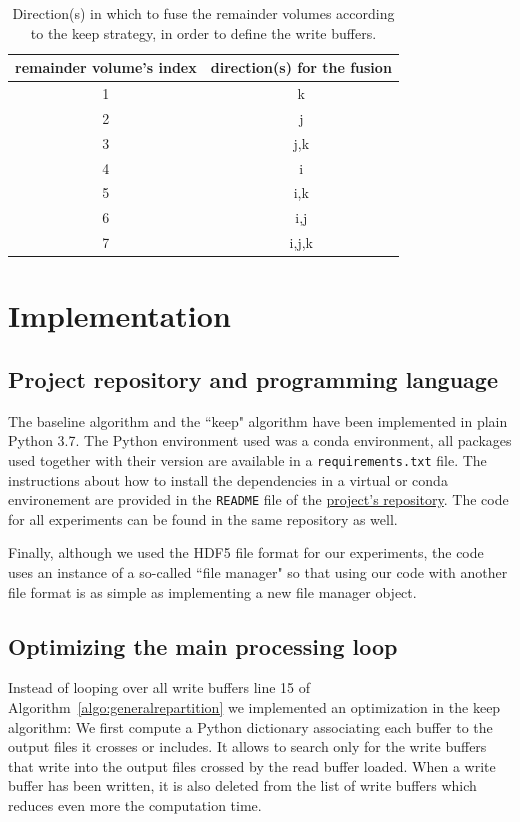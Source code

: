 \documentclass[sigconf, nonacm]{acmart}
\begin{document}
\begin{table}[ht]
  \centering
  \caption{Direction(s) in which to fuse the remainder volumes according to the keep strategy, in order to define the write buffers.}

   \begin{tabular}[t]{ | c | c | }
   \hline
   remainder volume's index & direction(s) for the fusion \\
     \hline\hline
     1 & k \\
     \hline
     2 & j \\
     \hline
     3 & j,k \\
     \hline
     4 & i \\
     \hline
     5 & i,k \\
     \hline
     6 & i,j \\
     \hline
     7 & i,j,k \\
     \hline
   \end{tabular}

   \label{tab:fusion}

\end{table}

\section{Implementation}

\subsection{Project repository and programming language}
The baseline algorithm and the ``keep" algorithm have been implemented in plain
Python 3.7.
The Python environment used was a conda environment, all packages used together
with their version are available in a \texttt{requirements.txt} file.
The instructions about how to install the dependencies in a virtual or conda
environement are provided in the \texttt{README} file of the
\href{https://github.com/GTimothee/repartition_experiments}{project's repository}.
The code for all experiments can be found in the same repository as well.

Finally, although we used the HDF5 file format for our experiments, the code
uses an instance of a so-called ``file manager" so that using our code with
another file format is as simple as implementing a new file manager object.

\subsection{Optimizing the main processing loop}
Instead of looping over all write buffers line 15 of
Algorithm~\ref{algo:generalrepartition} we implemented an optimization in
the keep algorithm:
We first compute a Python dictionary associating each buffer to the output files
it crosses or includes.
It allows to search only for the write buffers that write into the output files
crossed by the read buffer loaded. When a write buffer has been written, it
is also deleted from the list of write buffers which reduces even more the
computation time.
\end{document}

